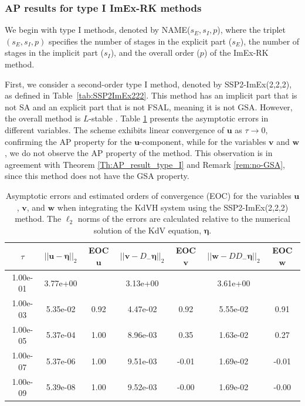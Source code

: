 \documentclass{article}
\newcommand{\ukdv}{\eta}
\begin{document}
\subsubsection{AP results for type I ImEx-RK methods}
We begin with type I methods, denoted by NAME($s_E, s_I, p$), where the triplet
$(s_E, s_I, p)$ specifies the number of stages in the explicit part ($s_E$),
the number of stages in the implicit part ($s_I$), and the overall order ($p$)
of the ImEx-RK method.

First, we consider a second-order type I method, denoted by SSP2-ImEx(2,2,2),
as defined in Table~\ref{tab:SSP2ImEx222}. This method has an implicit part that is
not SA and an explicit part that is not FSAL, meaning it is not GSA. However,
the overall method is $L$-stable \cite{boscarino2024asymptotic}. Table \ref{Table:SSP2-222_errors_num}
presents the asymptotic errors in different
variables. The scheme exhibits linear convergence of $\pmb{u}$
as $\tau \to 0$, confirming the AP property for the $\pmb{u}$-component, while for the variables $\pmb{v}$
and $\pmb{w}$, we do not observe the AP property of the method. This observation is in agreement
with Theorem \ref{Th:AP_result_type_I} and Remark \ref{rem:no-GSA}, since this method does not have the GSA property.

 \begin{table}[htbp]
    \centering
    \caption{Asymptotic errors and estimated orders of convergence (EOC) for the variables $\pmb{u}$, $\pmb{v}$, and $\pmb{w}$ when integrating
    the KdVH system using the SSP2-ImEx(2,2,2) method. The $\ell_2$ norms of the errors are calculated relative to
    the numerical solution of the KdV equation, $\pmb{\ukdv}$.}
    \label{Table:SSP2-222_errors_num}
    \begin{tabular}{ccccccc}
      \hline
      \hline
      \multicolumn{1}{c}{$\tau$} &
      \multicolumn{1}{c}{$||\pmb{u}-\pmb{\ukdv}||_2$} &
      \multicolumn{1}{c}{EOC $\pmb{u}$} &
      \multicolumn{1}{c}{$||\pmb{v}-D_- \pmb{\ukdv}||_2$} &
      \multicolumn{1}{c}{EOC $\pmb{v}$} &
      \multicolumn{1}{c}{$||\pmb{w}-D D_- \pmb{\ukdv}||_2$} &
      \multicolumn{1}{c}{EOC $\pmb{w}$} \\\hline
      1.00e-01 & 3.77e+00 &  & 3.13e+00 &  & 3.61e+00 &  \\
      1.00e-03 & 5.35e-02 & 0.92 & 4.47e-02 & 0.92 & 5.55e-02 & 0.91 \\
      1.00e-05 & 5.37e-04 & 1.00 & 8.96e-03 & 0.35 & 1.63e-02 & 0.27 \\
      1.00e-07 & 5.37e-06 & 1.00 & 9.51e-03 & -0.01 & 1.69e-02 & -0.01 \\
      1.00e-09 & 5.39e-08 & 1.00 & 9.52e-03 & -0.00 & 1.69e-02 & -0.00 \\
    \end{tabular}
\end{table}
\end{document}
